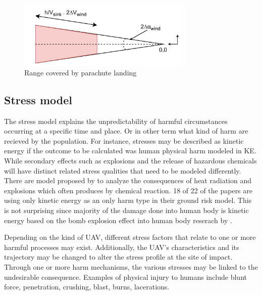 \documentclass[12pt]{report}
\begin{document}
            \begin{figure}[H]
                \centering
                \includegraphics[width=0.75\textwidth]{General Image/OSM Drone-Landing zone.pdf}
                \caption{Range covered by parachute landing}
                \label{fig:area_parachute}
            \end{figure}

        \subsection{Stress model}
                The stress model explains the unpredictability of harmful circumstances occurring at a specific time and
            place. Or in other term what kind of harm are recieved by the population. For instance, stresses may be
            described as kinetic energy if the outcome to be calculated was human physical harm modeled in \ac{KE}.
            While secondary effects such as explosions and the release of hazardous chemicals will have distinct related
            stress qualities that need to be modeled differently. There are model proposed by \cite{ball_crash_2012} to
            analyze the consequences of heat radiation and explosions which often produces by chemical reaction. 18 of
            22 of the papers are using only kinetic energy as an only harm type in their ground risk model. This is not
            surprising since majority of the damage done into human body is kinetic energy based on the bomb explosion
            effect into human body reserach by \cite{harwick_approved_2007}.

            Depending on the kind of UAV, different stress factors that relate to one or more harmful processes may
            exist. Additionally, the UAV's characteristics and its trajectory may be changed to alter the stress profile
            at the site of impact. Through one or more harm mechanisms, the various stresses may be linked to the
            undesirable consequence. Examples of physical injury to humans include blunt force, penetration, crushing,
            blast, burns, lacerations.
\end{document}
